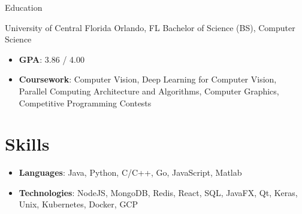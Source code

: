 \documentclass{resume}
\begin{document}
  \begin{fieldlist}{Education}

      {University of Central Florida}
      {Orlando, FL}
      {Bachelor of Science (BS), Computer Science}
      {
        \begin{itemize}
          \setlength\itemsep{0em}
          \item \textbf{GPA}: 3.86 / 4.00
          \item \textbf{Coursework}: Computer Vision, Deep Learning for Computer Vision, Parallel Computing Architecture and Algorithms, Computer Graphics, Competitive Programming Contests
        \end{itemize}
        
      }

  \end{fieldlist}
  \section{Skills}
      \begin{itemize}
        \item \textbf{Languages}: Java, Python, C/C++, Go, JavaScript, Matlab
        \item \textbf{Technologies}: NodeJS, MongoDB, Redis, React, SQL, JavaFX, Qt, Keras, Unix, Kubernetes, Docker, GCP
      \end{itemize}
\end{document}

